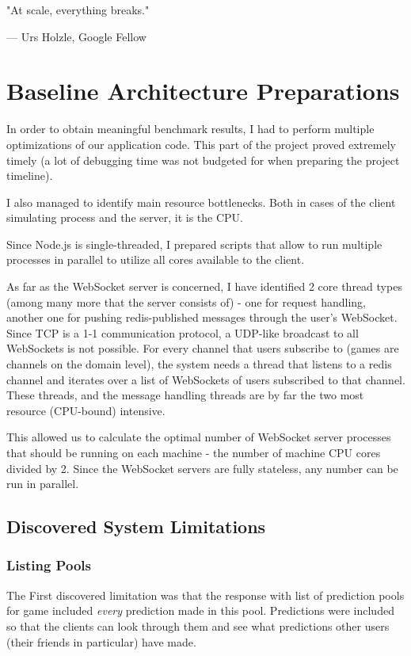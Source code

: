 \documentclass{uvamscse}
\begin{document}
\epigraph{"At scale, everything breaks."}{--- Urs Holzle, Google Fellow}

\section{Baseline Architecture Preparations}\label{Baseline Architecture Preparations}
In order to obtain meaningful benchmark results, I had to perform multiple optimizations of our application code. This part of the project proved extremely timely (a lot of debugging time was not budgeted for when preparing the project timeline).

I also managed to identify main resource bottlenecks. Both in cases of the client simulating process and the server, it is the CPU.

Since Node.js is single-threaded, I prepared scripts that allow to run multiple processes in parallel to utilize all cores available to the client.

As far as the WebSocket server is concerned, I have identified 2 core thread types (among many more that the server consists of) - one for request handling, another one for pushing redis-published messages through the user's WebSocket. Since TCP is a 1-1 communication protocol, a UDP-like broadcast to all WebSockets is not possible. For every channel that users subscribe to (games are channels on the domain level), the system needs a thread that listens to a redis channel and iterates over a list of WebSockets of users subscribed to that channel. These threads, and the message handling threads are by far the two most resource (CPU-bound) intensive.

This allowed us to calculate the optimal number of WebSocket server processes that should be running on each machine - the number of machine CPU cores divided by 2. Since the WebSocket servers are fully stateless, any number can be run in parallel.

\subsection{Discovered System Limitations}\label{Discovered System Limitations}

\subsubsection{Listing Pools}
The First discovered limitation was that the response with list of prediction pools for game included \textit{every} prediction made in this pool. Predictions were included so that the clients can look through them and see what predictions other users (their friends in particular) have made.
\end{document}
